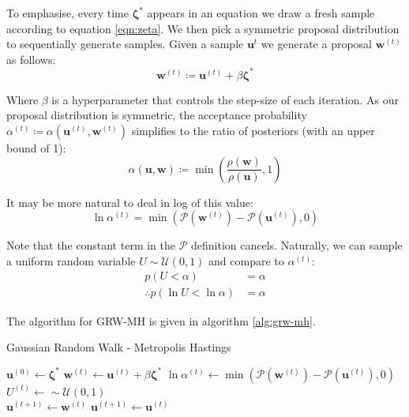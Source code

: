 \documentclass[]{article}
\newcommand{\ubold}{\boldsymbol{u}}
\newcommand{\wbold}{\boldsymbol{w}}
\newcommand{\zetabold}{\boldsymbol{\zeta^*}}
\newcommand{\Rho}{\mathcal{P}}
\begin{document}
To emphasise, every time $\zetabold$ appears in an equation we draw a fresh sample according to equation \ref{eqn:zeta}. We then pick a symmetric proposal distribution to sequentially generate samples. Given a sample $\ubold^{t}$ we generate a proposal $\wbold^{(t)}$ as follows:
%
\begin{equation}
	\wbold^{(t)} \coloneqq \ubold^{(t)} + \beta \zetabold
\end{equation}

Where $\beta$ is a hyperparameter that controls the step-size of each iteration. As our proposal distribution is symmetric, the acceptance probability $\alpha^{(t)} \coloneqq \alpha(\ubold^{(t)}, \wbold^{(t)})$ simplifies to the ratio of posteriors (with an upper bound of 1):
%
\begin{equation}
	\alpha(\ubold, \wbold) \coloneqq \min \left( \frac{\rho(\wbold)}{\rho(\ubold)}, 1 \right)
\end{equation}

It may be more natural to deal in log of this value:
%
\begin{equation}
	\ln \alpha^{(t)} = \min \left(\Rho(\wbold^{(t)}) - \Rho(\ubold^{(t)}), 0\right)
\end{equation}

Note that the constant term in the $\Rho$ definition cancels. Naturally, we can sample a uniform random variable $U \sim \mathcal{U}(0, 1)$ and compare to $\alpha^{(t)}$:
%
\begin{align}
	p(U < \alpha) &= \alpha \nonumber \\
	\therefore p(\ln U < \ln \alpha) &= \alpha
\end{align}

The algorithm for GRW-MH is given in algorithm \ref{alg:grw-mh}.
%
\begin{algorithm}
	\caption{Gaussian Random Walk - Metropolis Hastings}
	\label{alg:grw-mh}
\begin{algorithmic}
	\State $\ubold^{(0)} \gets \zetabold$
	\State $\wbold^{(t)} \gets \ubold^{(t)} + \beta \zetabold$ 
	\State $\ln \alpha^{(t)} \gets \min \left(\Rho(\wbold^{(t)}) - \Rho(\ubold^{(t)}), 0\right)$
	\State $U^{(t)} \gets \sim \mathcal{U}(0,1)$ \\
		\State $\ubold^{(t+1)} \gets \wbold^{(t)}$ 
	\Else
		\State $\ubold^{(t+1)} \gets \ubold^{(t)}$ 
	\EndIf
	\EndFor
\end{algorithmic}
\end{algorithm}
\end{document}
